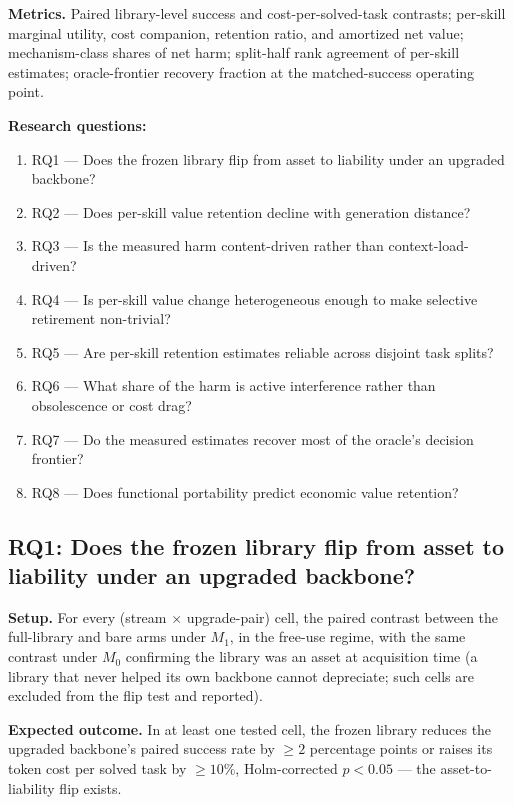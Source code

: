 \documentclass[11pt]{article}
\begin{document}
\textbf{Metrics.} Paired library-level success and cost-per-solved-task contrasts; per-skill marginal utility, cost companion, retention ratio, and amortized net value; mechanism-class shares of net harm; split-half rank agreement of per-skill estimates; oracle-frontier recovery fraction at the matched-success operating point.

\textbf{Research questions:}
\begin{enumerate}
  \item RQ1 --- Does the frozen library flip from asset to liability under an upgraded backbone?
  \item RQ2 --- Does per-skill value retention decline with generation distance?
  \item RQ3 --- Is the measured harm content-driven rather than context-load-driven?
  \item RQ4 --- Is per-skill value change heterogeneous enough to make selective retirement non-trivial?
  \item RQ5 --- Are per-skill retention estimates reliable across disjoint task splits?
  \item RQ6 --- What share of the harm is active interference rather than obsolescence or cost drag?
  \item RQ7 --- Do the measured estimates recover most of the oracle's decision frontier?
  \item RQ8 --- Does functional portability predict economic value retention?
\end{enumerate}

\subsection{RQ1: Does the frozen library flip from asset to liability under an upgraded backbone?}

\textbf{Setup.} For every (stream $\times$ upgrade-pair) cell, the paired contrast between the full-library and bare arms under $M_1$, in the free-use regime, with the same contrast under $M_0$ confirming the library was an asset at acquisition time (a library that never helped its own backbone cannot depreciate; such cells are excluded from the flip test and reported).

\textbf{Expected outcome.} In at least one tested cell, the frozen library reduces the upgraded backbone's paired success rate by $\geq 2$ percentage points or raises its token cost per solved task by $\geq 10\%$, Holm-corrected $p < 0.05$ --- the asset-to-liability flip exists.
\end{document}
